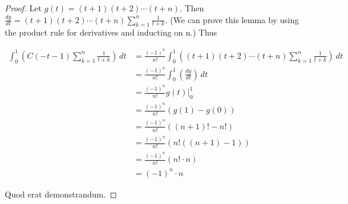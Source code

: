 \begin{proof}
Let $g(t) = (t + 1)(t + 2) \cdots (t + n)$. Then $\displaystyle \frac{dg}{dt} = (t + 1)(t + 2)\cdots(t + n) \sum_{k=1}^{n} \frac{1}{t + k}$. (We can prove this lemma by using the product rule for derivatives and inducting on n.) Thus

\begin{align*}
\int_0^1 \left(C(-t - 1) \sum_{k=1}^{n} \frac{1}{t + k} \right) \, dt 
&= \frac{(-1)^n}{n!} \int_0^1 \left( (t + 1)(t + 2)\cdots(t + n) \sum_{k=1}^{n} \frac{1}{t + k} \right) \, dt \\
&= \frac{(-1)^n}{n!} \int_0^1 \left( \frac{dg}{dt} \right) \, dt \\
&= \frac{(-1)^n}{n!} g(t) \Bigg|_0^1 \\
&= \frac{(-1)^n}{n!} (g(1) - g(0)) \\
&= \frac{(-1)^n}{n!} ((n+1)! - n!) \\
&= \frac{(-1)^n}{n!} (n! ((n + 1) - 1)) \\
&= \frac{(-1)^n}{n!} (n! \cdot n) \\
&= (-1)^n \cdot n
\end{align*}

Quod erat demonstrandum.
\end{proof}
